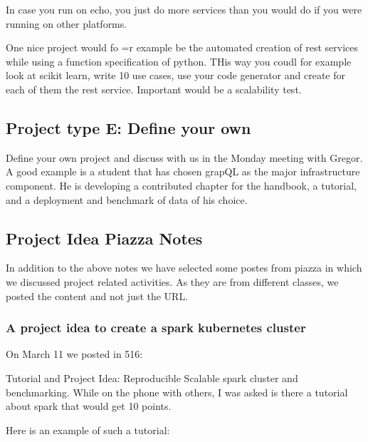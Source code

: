 In case you run on echo, you just do more services than you would do
if you were running on other platforms.

One nice project would fo =r example be the automated creation of rest
services while using a function specification of python. THis way you
coudl for example look at scikit learn, write 10 use cases, use your
code generator and create for each of them the rest service. Important
would be a scalability test.


\subsection{Project type E: Define your own}

Define your own project and discuss with us in the Monday meeting with
Gregor. 
A good example is a student that has chosen grapQL as the major
infrastructure component. He is developing a contributed chapter for
the handbook, a tutorial, and a deployment and benchmark of data of
his choice.


\subsection{Project Idea Piazza Notes}

In addition to the above notes we have selected some postes from
piazza in which we discussed project related activities. As they are
from different classes, we posted the content and not just the URL.


\subsubsection{A project idea to create a spark kubernetes cluster}

On March 11 we posted in 516:


Tutorial and Project Idea: Reproducible Scalable spark cluster and
benchmarking. While on the phone with others, I was asked is there a
tutorial about spark that would get 10 points.

Here is an example of such a tutorial:


